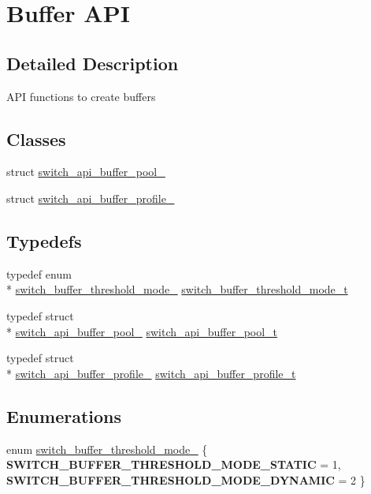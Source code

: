 \hypertarget{group__Buffer}{\section{Buffer A\+P\+I}
\label{group__Buffer}
}


\subsection{Detailed Description}
A\+P\+I functions to create buffers \subsection*{Classes}
\begin{DoxyCompactItemize}
\item 
struct \hyperlink{structswitch__api__buffer__pool__}{switch\+\_\+api\+\_\+buffer\+\_\+pool\+\_\+}
\item 
struct \hyperlink{structswitch__api__buffer__profile__}{switch\+\_\+api\+\_\+buffer\+\_\+profile\+\_\+}
\end{DoxyCompactItemize}
\subsection*{Typedefs}
\begin{DoxyCompactItemize}
\item 
typedef enum \\*
\hyperlink{group__Buffer_gac87a7ce93aa67b659785638242b57c9a}{switch\+\_\+buffer\+\_\+threshold\+\_\+mode\+\_\+} \hyperlink{group__Buffer_gad5d808c4c42a170d1afae11767fddeff}{switch\+\_\+buffer\+\_\+threshold\+\_\+mode\+\_\+t}
\item 
typedef struct \\*
\hyperlink{structswitch__api__buffer__pool__}{switch\+\_\+api\+\_\+buffer\+\_\+pool\+\_\+} \hyperlink{group__Buffer_ga1302c4962b38d77d99766608e5cb4ccd}{switch\+\_\+api\+\_\+buffer\+\_\+pool\+\_\+t}
\item 
typedef struct \\*
\hyperlink{structswitch__api__buffer__profile__}{switch\+\_\+api\+\_\+buffer\+\_\+profile\+\_\+} \hyperlink{group__Buffer_ga4d903bc1adf700cb1f2c3313c953e059}{switch\+\_\+api\+\_\+buffer\+\_\+profile\+\_\+t}
\end{DoxyCompactItemize}
\subsection*{Enumerations}
\begin{DoxyCompactItemize}
\item 
enum \hyperlink{group__Buffer_gac87a7ce93aa67b659785638242b57c9a}{switch\+\_\+buffer\+\_\+threshold\+\_\+mode\+\_\+} \{ {\bfseries S\+W\+I\+T\+C\+H\+\_\+\+B\+U\+F\+F\+E\+R\+\_\+\+T\+H\+R\+E\+S\+H\+O\+L\+D\+\_\+\+M\+O\+D\+E\+\_\+\+S\+T\+A\+T\+I\+C} = 1, 
{\bfseries S\+W\+I\+T\+C\+H\+\_\+\+B\+U\+F\+F\+E\+R\+\_\+\+T\+H\+R\+E\+S\+H\+O\+L\+D\+\_\+\+M\+O\+D\+E\+\_\+\+D\+Y\+N\+A\+M\+I\+C} = 2
 \}
\end{DoxyCompactItemize}
